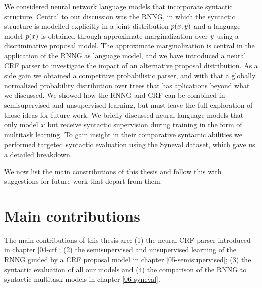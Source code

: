 We considered neural network language models that incorporate syntactic structure. Central to our discussion was the RNNG, in which the syntactic structure is modelled explicitly in a joint distribution $p( x, y )$ and a language model $p(x)$ is obtained through approximate marginalization over $y$ using a discriminative proposal model. The approximate marginalization is central in the application of the RNNG as language model, and we have introduced a neural CRF parser to investigate the impact of an alternative proposal distribution. As a side gain we obtained a competitive probabilistic parser, and with that a globally normalized probability distribution over trees that has aplications beyond what we discussed. We showed how the RNNG and CRF can be combined in semisupervised and unsupervised learning, but must leave the full exploration of those ideas for future work. We briefly discussed neural language models that only model $x$ but receive syntactic supervision during training in the form of multitask learning. To gain insight in their comparative syntactic abilities we performed targeted syntactic evaluation using the Syneval dataset, which gave us a detailed breakdown.

We now list the main constributions of this thesis and follow this with suggestions for future work that depart from them.

\section{Main contributions}
  The main contributions of this thesis are: (1) the neural CRF parser introduced in chapter \ref{04-crf}; (2) the semisupervised and unsupervised learning of the RNNG guided by a CRF proposal model in chapter \ref{05-semisupervised}; (3) the syntactic evaluation of all our models and (4) the comparison of the RNNG to syntactic multitask models in chapter \ref{06-syneval}.


